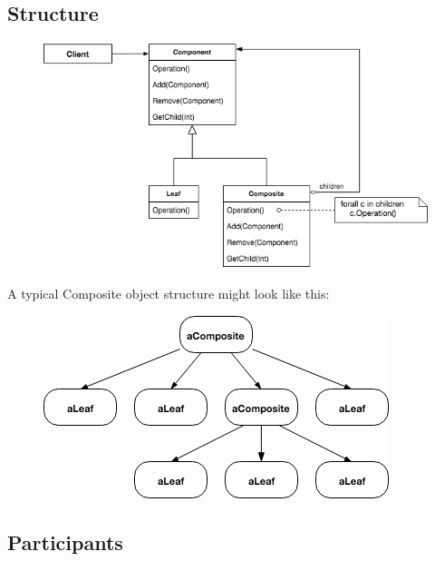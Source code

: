 \subsection*{Structure}

\begin{figure}[H]
\centering
\includegraphics[scale=0.6]{diagrams/composite_structure.png}
\end{figure}

A typical Composite object structure might look like this:

\begin{figure}[H]
\centering
\includegraphics[scale=0.7]{diagrams/composite_structure_s.png}
\end{figure}

\subsection*{Participants}

